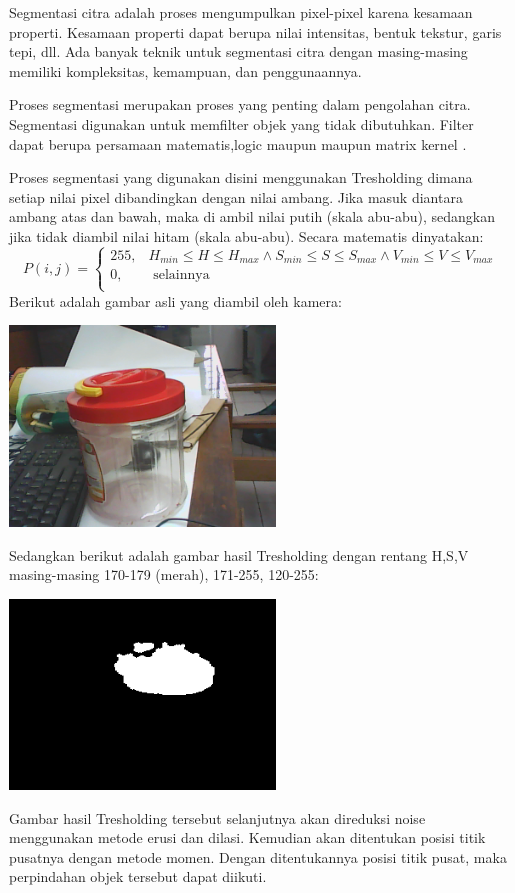 \documentclass[a4paper,12pt]{article}
\begin{document}
Segmentasi citra adalah proses mengumpulkan pixel-pixel karena kesamaan properti.
Kesamaan properti dapat berupa nilai intensitas, bentuk tekstur, garis tepi, dll.
Ada banyak teknik untuk segmentasi citra dengan masing-masing memiliki kompleksitas, kemampuan, dan penggunaannya.

Proses segmentasi merupakan proses yang penting dalam pengolahan citra.
Segmentasi digunakan untuk memfilter objek yang tidak dibutuhkan.
Filter dapat berupa persamaan matematis,logic maupun maupun matrix kernel \cite{improc1} .

Proses segmentasi yang digunakan disini menggunakan Tresholding dimana setiap nilai pixel dibandingkan dengan nilai ambang.
Jika masuk diantara ambang atas dan bawah, maka di ambil nilai putih (skala abu-abu), sedangkan jika tidak diambil nilai hitam (skala abu-abu).
Secara matematis dinyatakan:
\begin{equation}
  P(i,j) =  
  \begin{cases}
      255,& H_{min} \leq H\leq H_{max} \land S_{min} \leq S\leq S_{max} \land V_{min} \leq V\leq V_{max}\\
      0,              & \text{ selainnya } \\
  \end{cases}
\end{equation}
Berikut adalah gambar asli yang diambil oleh kamera:
\begin{center}
 \includegraphics[width=200pt]{imgori}
\end{center}
Sedangkan berikut adalah gambar hasil Tresholding dengan rentang H,S,V masing-masing 170-179 (merah), 171-255, 120-255:
\begin{center}
 \includegraphics[width=200pt]{imgthresh}
\end{center}
Gambar hasil Tresholding tersebut selanjutnya akan direduksi noise menggunakan metode erusi dan dilasi.
Kemudian akan ditentukan posisi titik pusatnya dengan metode momen.
Dengan ditentukannya posisi titik pusat, maka perpindahan objek tersebut dapat diikuti.
\end{document}
